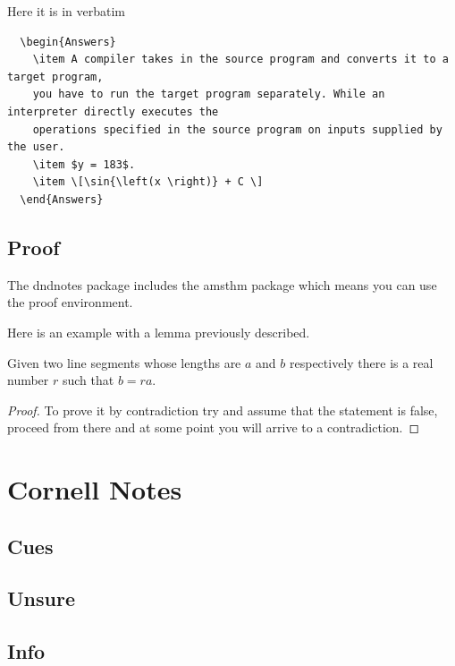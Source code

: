\documentclass[letterpaper,10pt,twoside,twocolumn,openany]{book}
\begin{document}
Here it is in verbatim
\begin{verbatim}
  \begin{Answers}
    \item A compiler takes in the source program and converts it to a target program, 
    you have to run the target program separately. While an interpreter directly executes the 
    operations specified in the source program on inputs supplied by the user. 
    \item $y = 183$. 
    \item \[\sin{\left(x \right)} + C \]
  \end{Answers} 
\end{verbatim}

\section{Proof}
The dndnotes package includes the amsthm package which means you can use the proof environment.

Here is an example with a lemma previously described. 
\begin{Lemma}
Given two line segments whose lengths are $a$ and $b$ respectively there 
is a real number $r$ such that $b=ra$.
\end{Lemma}
\begin{proof}
  To prove it by contradiction try and assume that the statement is false,
  proceed from there and at some point you will arrive to a contradiction.
\end{proof}

\chapter{Cornell Notes}
\section{Cues}
\lipsum[1][1-5]
\lipsum[1][6-10]

\section{Unsure}
\lipsum[2][1-5]
\lipsum[2][6-10]

\section{Info}
\lipsum[3][1-5]
\lipsum[3][6-10]
\end{document}
